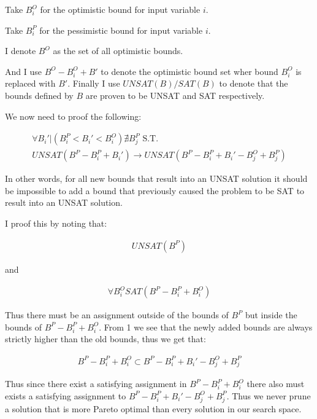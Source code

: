 
Take $B_i^O$ for the optimistic bound for input variable $i$.

Take $B_i^P$ for the pessimistic bound for input variable $i$.

I denote $B^O$ as the set of all optimistic bounds.

And I use $B^O - B_i^O +B'$ to denote the optimistic bound set wher bound $B_i^O$ is replaced with $B'$. Finally I use $UNSAT(B)/SAT(B)$ to denote that the bounds defined by $B$ are proven to be UNSAT and SAT respectively.

We now need to proof the following:

\begin{align}
    \forall B_i' | (B_i^P < B_i' < B_i^O)\nexists B_j^P \text{ S.T. } \\
    UNSAT(B^P - B_i^P + B_i') 
    \rightarrow UNSAT(B^P - B_i^P + B_i' - B_j^O + B_j^P)
\end{align}

In other words, for all new bounds that result into an UNSAT solution it should be impossible to add a bound that previously caused the problem to be SAT to result into an UNSAT solution.

I proof this by noting that:

\begin{align}
UNSAT(B^P)
\end{align}

and

\begin{align}
\forall B_i^O SAT(B^P - B_i^P + B_i^O)
\end{align}

Thus there must be an assignment outside of the bounds of $B^P$ but inside the bounds of $B^P - B_i^P + B_i^O$. From 1 we see that the newly added bounds are always strictly higher than the old bounds, thus we get that:

\begin{align}
B^P - B_i^P + B_i^O \subset B^P - B_i^P + B_i' - B_j^O + B_j^P
\end{align}


Thus since there exist a satisfying assignment in $B^P - B_i^P + B_i^O$ there also must exists a satisfying assignment to $B^P - B_i^P + B_i' - B_j^O + B_j^P$. 
Thus we never prune a solution that is more Pareto optimal than every solution in our search space.
